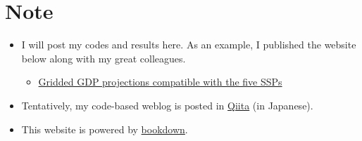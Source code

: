 \documentclass[]{book}
\providecommand{\tightlist}{%
  \setlength{\itemsep}{0pt}\setlength{\parskip}{0pt}}
\begin{document}
\hypertarget{note}{%
\chapter*{Note}\label{note}}

\begin{itemize}
\tightlist
\item
  I will post my codes and results here. As an example, I published the website below along with my great colleagues.

  \begin{itemize}
  \tightlist
  \item
    \href{https://gcp-tsukuba.github.io/SSP-downscale/}{Gridded GDP projections compatible with the five SSPs}
  \end{itemize}
\item
  Tentatively, my code-based weblog is posted in \href{https://qiita.com/3tky}{Qiita} (in Japanese).
\item
  This website is powered by \href{https://github.com/rstudio/bookdown}{bookdown}.
\end{itemize}


\end{document}
